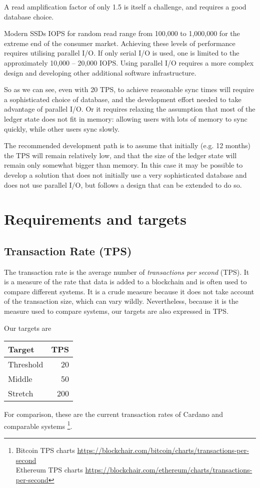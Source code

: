 \documentclass[11pt,a4paper]{article}
\begin{document}
A read amplification factor of only 1.5 is itself a challenge, and requires a
good database choice.

Modern SSDs IOPS for random read range from 100,000 to 1,000,000 for the
extreme end of the consumer market. Achieving these levels of performance
requires utilising parallel I/O. If only serial I/O is used, one is limited to
the approximately 10,000 -- 20,000 IOPS. Using parallel I/O requires a more
complex design and developing other additional software infrastructure.

So as we can see, even with 20 TPS, to achieve reasonable sync times will
require a sophisticated choice of database, and the development effort needed
to take advantage of parallel I/O. Or it requires relaxing the assumption that
most of the ledger state does not fit in memory: allowing users with lots of
memory to sync quickly, while other users sync slowly.

The recommended development path is to assume that initially (e.g. 12 months)
the TPS will remain relatively low, and that the size of the ledger state will
remain only somewhat bigger than memory. In this case it may be possible to
develop a solution that does not initially use a very sophisticated database
and does not use parallel I/O, but follows a design that can be extended to do
so.

\section{Requirements and targets}
\label{requirements}

\subsection{Transaction Rate (TPS)}

The transaction rate is the average number of \emph{transactions per second}
(TPS). It is a measure of the rate that data is added to a blockchain and is
often used to compare different systems. It is a crude measure because it does
not take account of the transaction size, which can vary wildly. Nevertheless,
because it is the measure used to compare systems, our targets are also
expressed in TPS.

Our targets are

\begin{center}
\begin{tabular}[]{lr}
  Target    & TPS \\
  \toprule
  Threshold &  20 \\
  Middle    &  50 \\
  Stretch   & 200
\end{tabular}
\end{center}
%
For comparison, these are the current transaction rates of Cardano and
comparable systems%
\footnote{Bitcoin TPS charts \url{https://blockchair.com/bitcoin/charts/transactions-per-second}\\
Ethereum TPS charts \url{https://blockchair.com/ethereum/charts/transactions-per-second}}.
\end{document}
